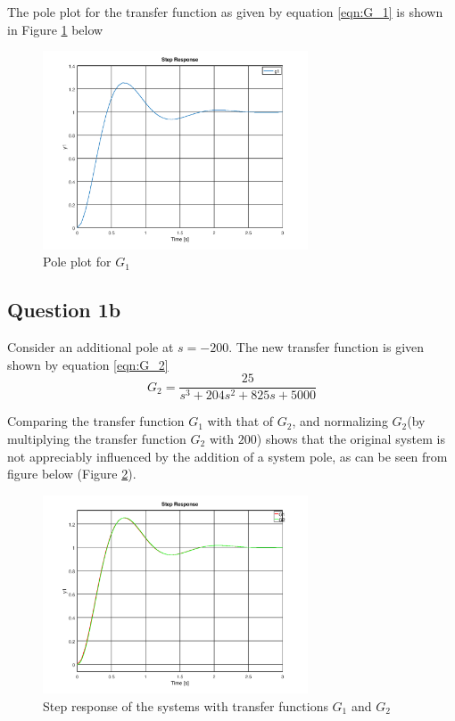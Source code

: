 \documentclass[12pt, a4paper]{article}
\begin{document}
		The pole plot for the transfer function as given by equation \ref{eqn:G_1} is shown in Figure \ref{fig:pole_plot_pre_g1a} below

		\begin{figure}[H]
			\centering
				\includegraphics[width=0.7\textwidth]{Images/pole_plot_pre_q1a.png}
				\caption{Pole plot for $G_1$}
				\label{fig:pole_plot_pre_g1a} 
		\end{figure}

		\subsection{Question 1b} %
		\label{sub:question_1b}
			Consider an additional pole at $s=-200$. The new transfer function is given shown by equation \eqref{eqn:G_2}
			\begin{equation}
				G_2 = \frac{25}{s^3+204s^2+825s+5000}
				\label{eqn:G_2}
			\end{equation}

			Comparing the transfer function $G_1$ with that of $G_2$, and normalizing $G_2$(by multiplying the transfer function $G_2$ with $200$) shows that the original system is not appreciably influenced by the addition of a system pole, as can be seen from figure below (Figure \ref{fig:step_pre_q1b}). 

			\begin{figure}[H]
				\centering
				\includegraphics[width=0.7\textwidth]{Images/step_pre_q1b.png}
				\caption{Step response of the systems with transfer functions $G_1$ and $G_2$}
				\label{fig:step_pre_q1b}
			\end{figure}
\end{document}
